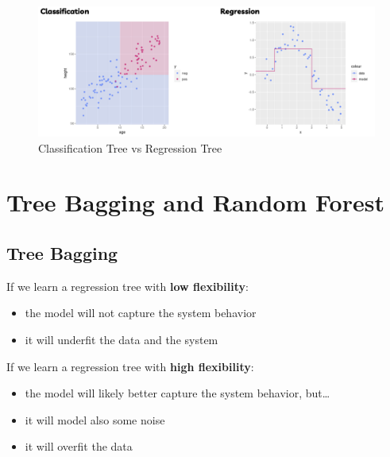 \begin{center}
    \begin{figure}[H]
        \centering 
        \includegraphics[width=1\textwidth]{assets/fig20.png}
        \caption{Classification Tree vs Regression Tree}
    \end{figure}
\end{center}

\section{Tree Bagging and Random Forest}

\subsection{Tree Bagging}

If we learn a regression tree with \textbf{low flexibility}:
\begin{itemize}
    \item the model will not capture the system behavior 
    \item it will underfit the data and the system 
\end{itemize}
If we learn a regression tree with \textbf{high flexibility}:
\begin{itemize}
    \item the model will likely better capture the system behavior, but\dots
    \item it will model also some noise
    \item it will overfit the data 
\end{itemize}





